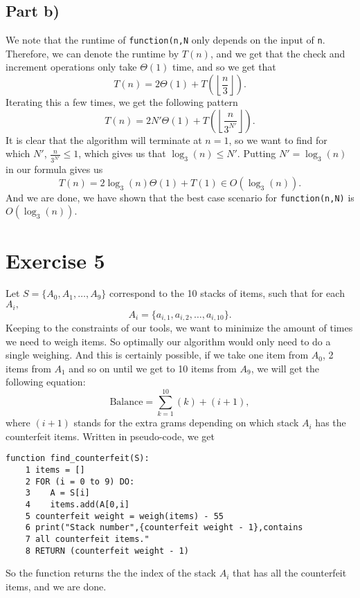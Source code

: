 \documentclass{article}
\begin{document}
\subsection*{Part b)}
We note that the runtime of  \texttt{function(n,N} only depends on the input of 
\texttt{n}. Therefore, we can denote the runtime by $T(n)$, and we get that 
the check and increment operations only take $\Theta(1)$ time, and so we get that
\[
T(n) = 2\Theta(1) + T\left(\left\lfloor \frac{n}{3} \right\rfloor\right).
\] Iterating this a few times, we get the following pattern  \[
T(n) = 2N'\Theta(1) + T\left(\left\lfloor \frac{n}{3^{N'}} \right\rfloor\right).
\]
It is clear that the algorithm will terminate at $n=1$, so we want
to find for which  $N'$, $\frac{n}{3^{N'}}\leq  1$, which gives
us that $\log_{3}(n) \leq N'$. Putting $N'=\log_{3}(n)$ in our formula gives us \[
T(n) = 2\log_{3}(n)\Theta(1) + T(1) \in O(\log_{3}(n)).
\] And we are done, we have shown that the best case scenario for 
\texttt{function(n,N)} is $O(\log_{3}(n))$.
\newpage
\section*{Exercise 5}
Let $ S = \{ A_0, A_{1}, \ldots, A_{9} \}$ correspond to the 10 stacks of items,
such that for each $A_{i},$ \[
    A_{i} = \{ a_{i,1}, a_{i,2}, \ldots, a_{i,10}\}.
\] 
Keeping to the constraints of our tools, we want to minimize the amount of times we
need to weigh items. So optimally our algorithm would only need to do a single
weighing. And this is certainly possible, if we take one item from $A_0$, 
2 items from $A_1$ and so on until we get to 10 items from $A_{9}$, we will get
the following equation: \[
\text{Balance} = \sum\limits_{k=1}^{10} (k) + (i + 1), \] where $(i+1)$
stands for the extra grams depending on which stack $A_{i}$ has the
counterfeit items.  Written in pseudo-code, we get 
\begin{lstlisting}
function find_counterfeit(S):
    1 items = []
    2 FOR (i = 0 to 9) DO:
    3    A = S[i]
    4    items.add(A[0,i]
    5 counterfeit weight = weigh(items) - 55 
    6 print("Stack number",{counterfeit weight - 1},contains
    7 all counterfeit items."
    8 RETURN (counterfeit weight - 1)
\end{lstlisting}
So the function returns the the index of the stack $A_{i}$ that has all
the counterfeit items, and we are done.
\end{document}
